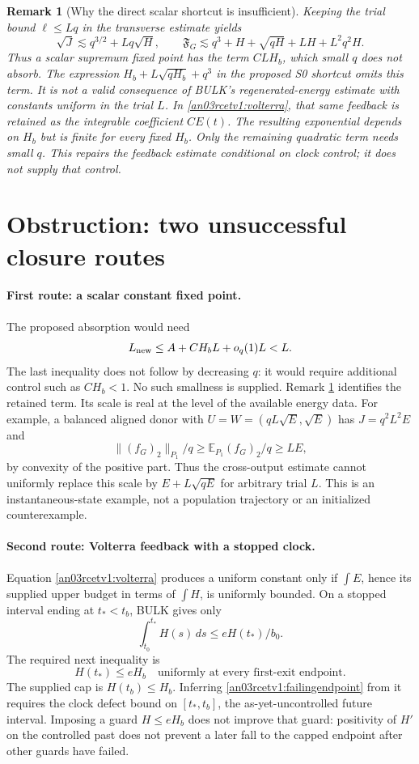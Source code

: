 \documentclass[11pt]{article}
\newtheorem{remark}[theorem]{Remark}
\newcommand{\E}{\mathbb E}
\newcommand{\dd}{\,d}
\begin{document}
\begin{remark}[Why the direct scalar shortcut is insufficient]
\label{an03rcetv1:scalar}
Keeping the trial bound $\ell\le Lq$ in the transverse estimate yields
\[
 \sqrt J\lesssim q^{3/2}+Lq\sqrt H,
 \qquad \mathfrak F_G\lesssim
 q^3+H+\sqrt{qH}+LH+L^2q^2H.
\]
Thus a scalar supremum fixed point has the term $CLH_b$, which
small $q$ does not absorb. The expression
$H_b+L\sqrt{qH_b}+q^3$ in the proposed S0 shortcut omits this term.
It is not a valid consequence of BULK's regenerated-energy estimate
with constants uniform in the trial $L$. In
\eqref{an03rcetv1:volterra}, that same feedback is retained as the
integrable coefficient $CE(t)$. The resulting exponential depends
on $H_b$ but is finite for every fixed $H_b$. Only the remaining
quadratic term needs small $q$. This repairs the feedback estimate
conditional on clock control; it does not supply that control.
\end{remark}

\section{Obstruction: two unsuccessful closure routes}
\label{an03rcetv1:obstruction}
\paragraph{First route: a scalar constant fixed point.}
The proposed absorption would need
\[
 L_{\rm new}\le A+C H_b L+o_q(1)L<L.
\]
The last inequality does not follow by decreasing $q$: it would
require additional control such as $CH_b<1$. No such smallness
is supplied. Remark \ref{an03rcetv1:scalar} identifies the retained
term. Its scale is real at the level of the available energy data.
For example, a balanced aligned donor with
$U=W=(qL\sqrt E,\sqrt E)$ has $J=q^2L^2E$ and
\[
 \|(f_G)_2\|_{P_1}/q
 \ge\E_{P_1}(f_G)_2/q\ge LE,
\]
by convexity of the positive part. Thus the cross-output estimate
cannot uniformly replace this scale by $E+L\sqrt{qE}$ for arbitrary
trial $L$. This is an instantaneous-state example, not a population
trajectory or an initialized counterexample.

\paragraph{Second route: Volterra feedback with a stopped clock.}
Equation \eqref{an03rcetv1:volterra} produces a uniform constant only
if $\int E$, hence its supplied upper budget in terms of $\int H$,
is uniformly bounded. On a stopped interval ending at $t_*<t_b$,
BULK gives only
\[
 \int_{t_0}^{t_*}H(s)\dd s\le e H(t_*)/b_0.
\]
The required next inequality is
\begin{equation}\label{an03rcetv1:failingendpoint}
 H(t_*)\le e H_b\quad\text{uniformly at every first-exit endpoint}.
\end{equation}
The supplied cap is $H(t_b)\le H_b$. Inferring
\eqref{an03rcetv1:failingendpoint} from it requires the clock defect
bound on $[t_*,t_b]$, the as-yet-uncontrolled future interval.
Imposing a guard $H\le eH_b$ does not improve that guard: positivity
of $H'$ on the controlled past does not prevent a later fall to the
capped endpoint after other guards have failed.
\end{document}
